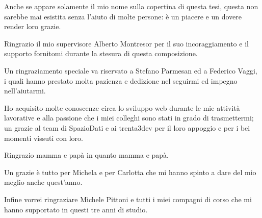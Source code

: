 
Anche se appare solamente il mio nome sulla copertina di questa tesi, questa non sarebbe mai esistita senza l'aiuto di molte persone: è un piacere e un dovere render loro grazie.

Ringrazio il mio supervisore Alberto Montresor per il suo incoraggiamento e il supporto fornitomi durante la stesura di questa composizione.

Un ringraziamento speciale va riservato a Stefano Parmesan ed a Federico Vaggi, i quali hanno prestato molta pazienza e dedizione nel seguirmi ed impegno nell'aiutarmi.

Ho acquisito molte conoscenze circa lo sviluppo web durante le mie attività lavorative e alla passione che i miei colleghi sono stati in grado di trasmettermi; un grazie al team di SpazioDati e ai trenta3dev per il loro appoggio e per i bei momenti vissuti con loro.

Ringrazio mamma e papà in quanto mamma e papà.

Un grazie è tutto per Michela e per Carlotta che mi hanno spinto a dare del mio meglio anche quest'anno.

Infine vorrei ringraziare Michele Pittoni e tutti i miei compagni di corso che mi hanno supportato in questi tre anni di studio.